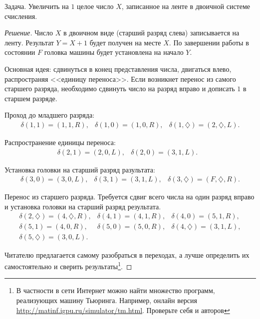 \begin{exampl}
    Задача. Увеличить на $1$ целое число $X$, записанное на ленте в двоичной системе счисления.
\end{exampl}
\begin{proof}[Решение]
    Число $X$ в двоичном виде (старший разряд слева) записывается на ленту. Результат $Y=X+1$ будет получен на месте $X$. По завершении работы в состоянии $F$ головка машины будет установлена на начало $Y$.
    
    Основная идея: сдвинуться в конец представления числа, двигаться влево, распространяя <<единицу переноса>>. Если возникнет перенос из самого старшего разряда, необходимо сдвинуть число на разряд вправо и дописать $1$ в старшем разряде.

    Проход до младшего разряда:
    \[
        \begin{array}{lll}
            \delta(1,1)=(1,1,R),
                &\delta(1,0)=(1,0,R),
                    &\delta(1,\diamondsuit)=(2,\diamondsuit,L).
        \end{array}
    \]            

    Распространение единицы переноса:
    \[
        \begin{array}{lll}
            \delta(2,1)=(2,0,L),
                &\delta(2,0)=(3,1,L).
                    &
        \end{array}
    \]            
        
    Установка головки на старший разряд разультата:
    \[
        \begin{array}{lll}
            \delta(3,0)=(3,0,L),
                &\delta(3,1)=(3,1,L),
                    &\delta(3,\diamondsuit)=(F,\diamondsuit,R).
        \end{array}
    \]            

    Перенос из старшего разряда. Требуется сдвиг всего числа на один разряд вправо и установка головки на старший разряд результата.
    \[
        \begin{array}{lll}
            \delta(2,\diamondsuit)=(4,\diamondsuit,R),
                &\delta(4,1)=(4,1,R),
                    &\delta(4,0)=(5,1,R),\\
            \delta(5,1)=(4,0,R),
                &\delta(5,0)=(5,0,R),
                    &\delta(4,\diamondsuit)=(3,1,L),\\
            \delta(5,\diamondsuit)=(3,0,L).
                &
                    &
        \end{array}
    \]

    Читателю предлагается самому разобраться в переходах, а лучше определить их самостоятельно и сверить результаты\footnote{В частности в сети Интернет можно найти множество программ, реализующих машину Тьюринга. Например, онлайн версия \url{http://matinf.igpu.ru/simulator/tm.html}. Проверьте себя и авторов}.
\end{proof}

